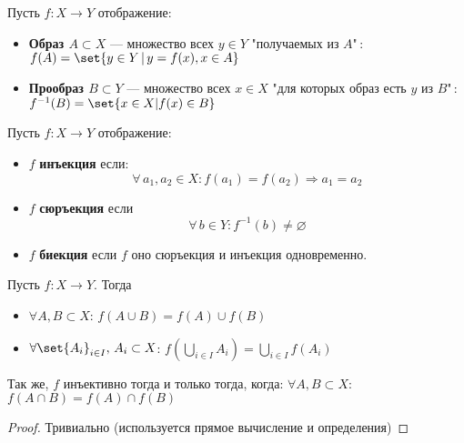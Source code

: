 \documentclass{article}
\begin{document}
\begin{definition}
    \label{def:image-preimage}
    Пусть \(f: X \rightarrow Y\) отображение:
    \begin{itemize}
        \item \textbf{Образ \(A \subset X\)} --- множество всех \(y \in Y\) "получаемых из \(A\)"\,: \(f(A) = \set{y \in Y \,|\, y = f(x), x \in A}\)
        \item \textbf{Прообраз \(B \subset Y\)} --- множество всех \(x \in X\) "для которых образ есть \(y\) из \(B\)"\,: \(f^{-1}(B) = \set{x \in X | f(x) \in B}\)
    \end{itemize}
\end{definition}

\begin{definition}
    \label{def:inj-surj-bij-maps}
        Пусть \(f: X \rightarrow Y\) отображение:
    \begin{itemize}
        \item \(f\) \textbf{инъекция} если: 
        \[\forall\, a_1, a_2 \in X: f(a_1) = f(a_2) \Rightarrow a_1 = a_2\]
        \item \(f\) \textbf{сюръекция} если
        \[\forall\, b \in Y: f^{-1}(b) \neq \varnothing\]
        \item \(f\) \textbf{биекция} если \(f\) оно сюръекция и инъекция одновременно.
    \end{itemize}
\end{definition}

\begin{proposition}
    \label{prop:image-properties}
    Пусть \(f: X \rightarrow Y\). Тогда 
    \begin{itemize}
        \item \(\forall A, B \subset X\): \(f(A \cup B) = f(A) \cup f(B)\)
        \item \(\forall \set{A_i}_{i \in I},\, A_i \subset X\):  \(f(\bigcup_{i \in I} A_i) = \bigcup_{i \in I} f(A_i)\)
    \end{itemize}
    Так же, \(f\) инъективно тогда и только тогда, когда:  \(\forall A, B \subset X\): \(f(A \cap B) = f(A) \cap f(B)\)
\end{proposition}
\begin{proof}
    Тривиально (используется прямое вычисление и определения)
\end{proof}
\end{document}
